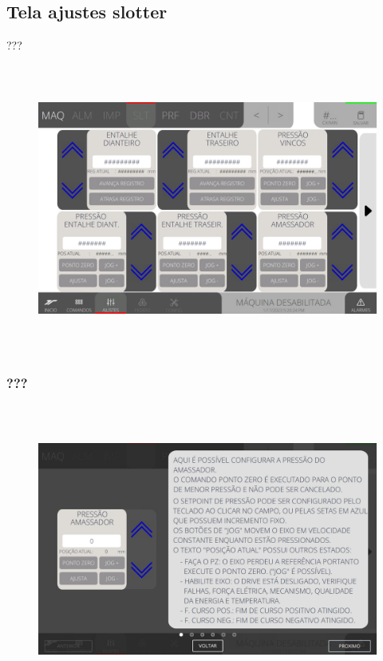 \thispagestyle{fancy}
\vspace*{\fill}
\subsection{Tela ajustes slotter}
 ???
\begin{figure}[h]
  \centering
  \includegraphics[width=576px,height=360px]{src/imagesFlexo/05-slotter/settings/e-Tela-Principal.png}
   \label{}
\end{figure}

\newpage
\thispagestyle{fancy}
\vspace*{\fill}
\subsubsection{\small{???}}
\begin{figure}[h]
  \centering
  \includegraphics[width=576px,height=360px]{src/imagesFlexo/05-slotter/settings/e-1.png}
   \label{}
\end{figure}
\vspace*{\fill}

